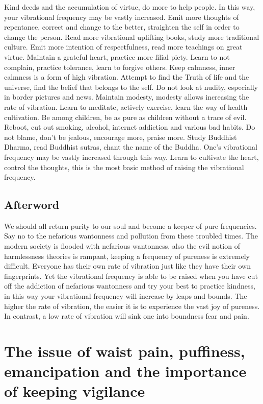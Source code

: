 \documentclass[
]{book}
\begin{document}
Kind deeds and the accumulation of virtue, do more to help people. In this way, your vibrational frequency may be vastly increased.
Emit more thoughts of repentance, correct and change to the better, straighten the self in order to change the person.
Read more vibrational uplifting books, study more traditional culture.
Emit more intention of respectfulness, read more teachings on great virtue.
Maintain a grateful heart, practice more filial piety.
Learn to not complain, practice tolerance, learn to forgive others.
Keep calmness, inner calmness is a form of high vibration.
Attempt to find the Truth of life and the universe, find the belief that belongs to the self.
Do not look at nudity, especially in border pictures and news.
Maintain modesty, modesty allows increasing the rate of vibration.
Learn to meditate, actively exercise, learn the way of health cultivation.
Be among children, be as pure as children without a trace of evil.
Reboot, cut out smoking, alcohol, internet addiction and various bad habits.
Do not blame, don't be jealous, encourage more, praise more.
Study Buddhist Dharma, read Buddhist sutras, chant the name of the Buddha. One's vibrational frequency may be vastly increased through this way.
Learn to cultivate the heart, control the thoughts, this is the most basic method of raising the vibrational frequency.

\hypertarget{afterword-3}{%
\section{Afterword}\label{afterword-3}}

We should all return purity to our soul and become a keeper of pure frequencies. Say no to the nefarious wantonness and pollution from these troubled times. The modern society is flooded with nefarious wantonness, also the evil notion of harmlessness theories is rampant, keeping a frequency of pureness is extremely difficult. Everyone has their own rate of vibration just like they have their own fingerprints. Yet the vibrational frequency is able to be raised when you have cut off the addiction of nefarious wantonness and try your best to practice kindness, in this way your vibrational frequency will increase by leaps and bounds. The higher the rate of vibration, the easier it is to experience the vast joy of pureness. In contrast, a low rate of vibration will sink one into boundness fear and pain.

\hypertarget{the-issue-of-waist-pain-puffiness-emancipation-and-the-importance-of-keeping-vigilance}{%
\chapter{The issue of waist pain, puffiness, emancipation and the importance of keeping vigilance}\label{the-issue-of-waist-pain-puffiness-emancipation-and-the-importance-of-keeping-vigilance}}
\end{document}
